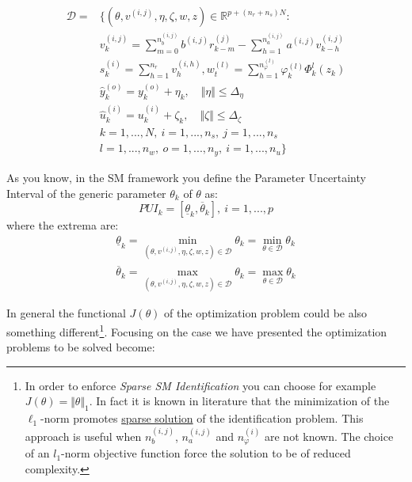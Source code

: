 \begin{multicols}{2}
    \noindent
    \begin{equation}
        \begin{aligned}
            \mathcal{D}=&\big\{
                (\theta,v^{(i,j)},\eta,\zeta,w,z)\in\mathbb{R}^{p+(n_r+n_s)N}:\\
                 &v_k^{(i,j)}=\sum_{m=0}^{n_b^{(i,j)}} {
                    b^{(i,j)} r_{k-m}^{(j)} 
                } - \sum_{h=1}^{n_a^{(i,j)}} {
                    a^{(i,j)} v_{k-h}^{(i,j)} }\\
                &s_k^{(i)}=\sum_{h=1}^{n_r}{v_h^{(i,h)}},
                w_t^{(l)}=\sum_{h=1}^{n_{\varphi}^{(l)}}{
                    \varphi_k^{(l)} \varPhi_k^l(z_k)}\\
                &\hat{y}_k^{(o)}=y_k^{(o)}+\eta_k, \quad 
                \Vert \eta \Vert \le \Delta_\eta\\
                &\hat{u}_k^{(i)}=u_k^{(i)}+\zeta_k, \quad 
                \Vert \zeta \Vert \le \Delta_\zeta\\
                &k=1,...,N, \ i=1,...,n_s, \ j=1,...,n_s \\
                &l=1,...,n_w, \ o=1,...,n_y, \ i=1,...,n_u
            \big\}
        \end{aligned}
    \end{equation}
    
    As you know, in the SM framework you define the Parameter Uncertainty Interval of the generic parameter $\theta_k$ of $\theta$ as:
    \begin{equation*}
        PUI_k=[\underline{\theta}_k, \overline{\theta}_k], \ i=1,...,p
    \end{equation*} where the extrema are: 
    \begin{align}
        \underline{\theta}_k = \min_{(\theta,v^{(i,j)},\eta,\zeta,w,z)\in\mathcal{D}} \theta_k= \min_{\theta\in\mathcal{D}} \theta_k  \\
        \overline{\theta}_k = \max_{(\theta,v^{(i,j)},\eta,\zeta,w,z)\in\mathcal{D}} \theta_k= \max_{\theta\in\mathcal{D}} \theta_k 
    \end{align}
    
\end{multicols}

In general the functional $J(\theta)$ of the optimization problem could be also something different\footnote{
    In order to enforce \textit{Sparse SM Identification} you can choose for example $J(\theta)=\Vert \theta \Vert_1$. In fact it is known in literature that the minimization of the $\ell_1$-norm promotes \underline{sparse solution} of the identification problem. This approach is useful when $n_b^{(i,j)}$, $n_a^{(i,j)}$ and $n_\varphi^{(i)}$ are not known. The choice of an $l_1$-norm objective function force the solution to be of reduced complexity. 
}. Focusing on the case we have presented the optimization problems to be solved become:

